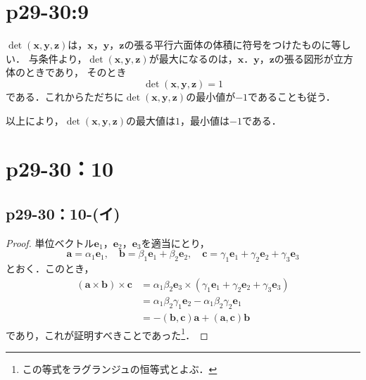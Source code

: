 \documentclass[a4paper,10pt,fleqn]{ltjsarticle}
\begin{document}
\section*{p29-30:9}

\begin{tleftbar}
    $ \det (\bm{x},\bm{y},\bm{z})$は，$\bm{x}$，$\bm{y}$，$\bm{z}$の張る平行六面体の体積に符号をつけたものに等しい．
    与条件より，$\det (\bm{x},\bm{y},\bm{z})$が最大になるのは，$\bm{x}$．$\bm{y}$，$\bm{z}$の張る図形が立方体のときであり，
    そのとき
    \[
        \det (\bm{x},\bm{y},\bm{z}) =1
    \]
    である．これからただちに$\det (\bm{x},\bm{y},\bm{z})$の最小値が$-1$であることも従う．

    以上により，$\det (\bm{x},\bm{y},\bm{z})$の最大値は$1$，最小値は$-1$である．
\end{tleftbar}

\section*{p29-30：10}

\subsection*{p29-30：10-(イ)}

\begin{tleftbar}
    \begin{proof}
        単位ベクトル$\bm{e}_1$，$\bm{e}_2$，$\bm{e}_3$を適当にとり，
        \[
            \bm{a} = \alpha_1 \bm{e}_1,\quad \bm{b} = \beta_1 \bm{e}_1+\beta_2 \bm{e}_2,\quad \bm{c}= \gamma_1 \bm{e}_1 + \gamma_2 \bm{e}_2 + \gamma_3 \bm{e}_3
        \]
        とおく．このとき，
        \begin{align*}
            (\bm{a} \times \bm{b}) \times \bm{c} & = \alpha_1 \beta_2 \bm{e}_3 \times (\gamma_1 \bm{e}_1 + \gamma_2 \bm{e}_2 + \gamma_3 \bm{e}_3) \\
                                                 & = \alpha_1 \beta_2 \gamma_1 \bm{e}_2 - \alpha_1 \beta_2 \gamma_2 \bm{e}_1                      \\
                                                 & = -(\bm{b},\bm{c})\bm{a}+(\bm{a},\bm{c}) \bm{b}
        \end{align*}
        であり，これが証明すべきことであった\footnote{この等式をラグランジュの恒等式とよぶ．}．
    \end{proof}
\end{tleftbar}
\end{document}
